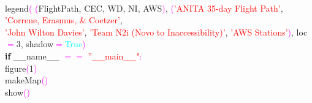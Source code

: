 {\\
\indent legend\textcolor{magenta}{(} \textcolor{magenta}{(}FlightPath, CEC, WD, NI, AWS\textcolor{magenta}{)}, \textcolor{magenta}{(}\textcolor{red}{'ANITA 35-day Flight Path'}, \textcolor{red}{'Correne, Erasmus, \& Coetzer'}, \\ \indent \textcolor{red}{'John Wilton Davies'}, \textcolor{red}{'Team N2i (Novo to Inaccessibility)'}, \textcolor{red}{'AWS Stations'}\textcolor{magenta}{)}, loc\textcolor{magenta}{$=$}3, shadow\textcolor{magenta}{$=$}\textcolor{cyan}{True}\textcolor{magenta}{)} \\
\noindent \textbf{if} \_\_name\_\_ \textcolor{magenta}{\textcolor{magenta}{$=$}\textcolor{magenta}{$=$}} \textcolor{red}{''\_\_main\_\_"}\textcolor{magenta}{:} \\
\indent figure\textcolor{magenta}{(}1\textcolor{magenta}{)} \\
\indent makeMap\textcolor{magenta}{(}\textcolor{magenta}{)} \\
\indent show\textcolor{magenta}{(}\textcolor{magenta}{)} \\
}

